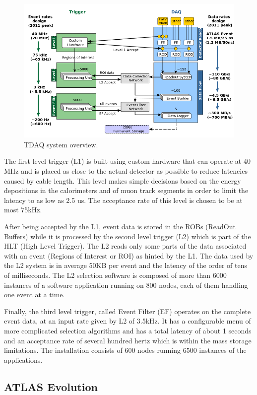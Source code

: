 \begin{figure}[ht!]
\centering
\includegraphics[scale=0.5]{Images/Trigger.png}
\caption{TDAQ system overview.}
\end{figure}

The first level trigger (L1) is built using custom hardware that can operate at 40 MHz and is placed as close to the actual detector as possible to reduce latencies caused by cable length. This level makes simple decisions based on the energy depositions in the calorimeters and of muon track segments in order to limit the latency to as low as 2.5 us. The acceptance rate of this level is chosen to be at most 75kHz. 

After being accepted by the L1, event data is stored in the ROBs (ReadOut Buffers) while it is processed by the second level trigger (L2) which is part of the HLT (High Level Trigger). The L2 reads only some parts of the data associated with an event (Regions of Interest or ROI) as hinted by the L1. The data used by the L2 system is in average 50KB per event and the latency of the order of tens of milliseconds. The L2 selection software is composed of more than 6000 instances of a software application running on 800 nodes, each of them handling one event at a time. 

Finally, the third level trigger, called Event Filter (EF) operates on the complete event data, at an input rate given by L2 of 3.5kHz. It has a configurable menu of more complicated selection algorithms and has a total latency of about 1 seconds and an acceptance rate of several hundred hertz which is within the mass storage limitations. The installation consists of 600 nodes running 6500 instances of the applications.

\subsection*{ATLAS Evolution}

